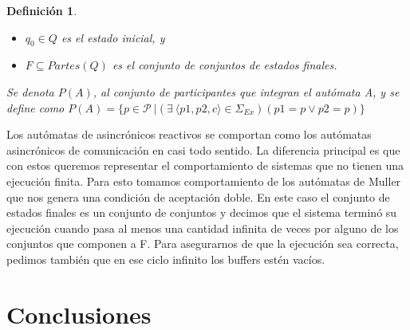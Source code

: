 \documentclass[paper=a4, fontsize=11pt, spanish]{scrartcl} %
\numberwithin{equation}{section} %
\numberwithin{figure}{section} %
\numberwithin{table}{section} %
\newtheorem{definition}{Definición}
\begin{document}
\begin{definition}
\begin{itemize}
\item $q_0 \in Q$ es el estado inicial, y
\item $F \subseteq \mathit{Partes(Q)}$ es el conjunto de conjuntos de estados finales. 
\end{itemize}

Se denota $P(A)$, al conjunto de participantes que integran el autómata A, y se define como $P(A) = \{ p \in \mathcal{P} \ | (\exists\ \langle p1,p2,c\rangle \in \Sigma_\mathit{Ex})(p1=p \lor p2=p) \} $ 
\end{definition}

Los autómatas de asincrónicos reactivos se comportan como los autómatas asincrónicos de comunicación en casi todo sentido. La diferencia principal es que con estos queremos representar el comportamiento de sistemas que no tienen una ejecución finita. Para esto tomamos comportamiento de los autómatas de Muller que nos genera una condición de aceptación doble. En este caso el conjunto de estados finales es un conjunto de conjuntos y decimos que el sistema terminó su ejecución cuando pasa al menos una cantidad infinita de veces por alguno de los conjuntos que componen a F. Para asegurarnos de que la ejecución sea correcta, pedimos también que en ese ciclo infinito los buffers estén vacíos.


\section{Conclusiones}



\end{document}
